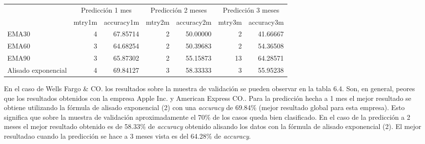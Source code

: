 \documentclass[]{article}
\newenvironment{Shaded}{\begin{snugshade}}{\end{snugshade}}
\newcommand{\KeywordTok}[1]{\textcolor[rgb]{0.13,0.29,0.53}{\textbf{#1}}}
\newcommand{\DataTypeTok}[1]{\textcolor[rgb]{0.13,0.29,0.53}{#1}}
\newcommand{\DecValTok}[1]{\textcolor[rgb]{0.00,0.00,0.81}{#1}}
\newcommand{\StringTok}[1]{\textcolor[rgb]{0.31,0.60,0.02}{#1}}
\newcommand{\OperatorTok}[1]{\textcolor[rgb]{0.81,0.36,0.00}{\textbf{#1}}}
\newcommand{\NormalTok}[1]{#1}
\begin{document}
\begin{Shaded}
\end{Shaded}

\begin{table}[H]
\centering\begingroup\fontsize{10}{12}\selectfont

\begin{tabular}{l|r|r|r|r|r|r}
\hline
\multicolumn{1}{c|}{ } & \multicolumn{2}{|c|}{Predicción 1 mes} & \multicolumn{2}{|c|}{Predicción 2 meses} & \multicolumn{2}{|c}{Predicción 3 meses} \\
\cline{2-3} \cline{4-5} \cline{6-7}
  & mtry1m & accuracy1m & mtry2m & accuracy2m & mtry3m & accuracy3m\\
\hline
EMA30 & 4 & 67.85714 & 2 & 50.00000 & 2 & 41.66667\\
\hline
EMA60 & 3 & 64.68254 & 2 & 50.39683 & 2 & 54.36508\\
\hline
EMA90 & 3 & 65.87302 & 2 & 55.15873 & 13 & 64.28571\\
\hline
Alisado exponencial & 4 & 69.84127 & 3 & 58.33333 & 3 & 55.95238\\
\hline
\end{tabular}\endgroup{}
\end{table}


\setlength\parskip{5ex} En el caso de Wells Fargo \& CO. los resultados
sobre la muestra de validación se pueden observar en la tabla 6.4. Son,
en general, peores que los resultados obtenidos con la empresa Apple
Inc. y American Express CO.. Para la predicción hecha a 1 mes el mejor
resultado se obtiene utilizando la fórmula de alisado exponencial (2)
con una \emph{accuracy} de 69.84\% (mejor resultado global para esta
empresa). Esto significa que sobre la muestra de validación
aproximadamente el 70\% de los casos queda bien clasificado. En el caso
de la predicción a 2 meses el mejor resultado obtenido es de 58.33\% de
\emph{accuracy} obtenido alisando los datos con la fórmula de alisado
exponencial (2). El mejor resultadao cuando la predicción se hace a 3
meses vista es del 64.28\% de \emph{accuracy}.
\end{document}

